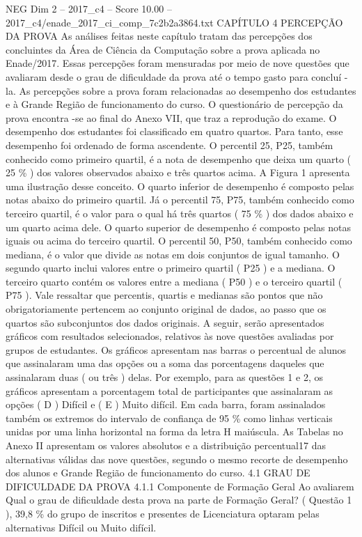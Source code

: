 \begin{textsample}{NEG Dim 2 – 2017\_c4 – Score 10.00 – 2017\_c4/enade\_2017\_ci\_comp\_7c2b2a3864.txt}  \label{ex:f2_neg_343}
CAPÍTULO 4 PERCEPÇÃO DA PROVA As análises feitas neste capítulo tratam das percepções dos concluintes da Área de Ciência da Computação sobre a prova aplicada no Enade/2017.
Essas percepções foram mensuradas por meio de nove questões que avaliaram desde o grau de dificuldade da prova até o tempo gasto para concluí -la.
As percepções sobre a prova foram relacionadas ao desempenho dos estudantes e à Grande Região de funcionamento do curso.
O questionário de percepção da prova encontra -se ao final do Anexo VII, que traz a reprodução do exame.
O desempenho dos estudantes foi classificado em quatro quartos.
Para tanto, esse desempenho foi ordenado de forma ascendente.
O percentil 25, P25, também conhecido como primeiro quartil, é a nota de desempenho que deixa um quarto ( 25 \% ) dos valores observados abaixo e três quartos acima.
A Figura 1 apresenta uma ilustração desse conceito.
O quarto inferior de desempenho é composto pelas notas abaixo do primeiro quartil.
Já o percentil 75, P75, também conhecido como terceiro quartil, é o valor para o qual há três quartos ( 75 \% ) dos dados abaixo e um quarto acima dele.
O quarto superior de desempenho é composto pelas notas iguais ou acima do terceiro quartil.
O percentil 50, P50, também conhecido como mediana, é o valor que divide as notas em dois conjuntos de igual tamanho.
O segundo quarto inclui valores entre o primeiro quartil ( P25 ) e a mediana.
O terceiro quarto contém os valores entre a mediana ( P50 ) e o terceiro quartil ( P75 ).
Vale ressaltar que percentis, quartis e medianas são pontos que não obrigatoriamente pertencem ao conjunto original de dados, ao passo que os quartos são subconjuntos dos dados originais.
A seguir, serão apresentados gráficos com resultados selecionados, relativos às nove questões avaliadas por grupos de estudantes.
Os gráficos apresentam nas barras o percentual de alunos que assinalaram uma das opções ou a soma das porcentagens daqueles que assinalaram duas ( ou três ) delas.
Por exemplo, para as questões 1 e 2, os gráficos apresentam a porcentagem total de participantes que assinalaram as opções ( D ) Difícil e ( E ) Muito difícil.
Em cada barra, foram assinalados também os extremos do intervalo de confiança de 95 \% como linhas verticais unidas por uma linha horizontal na forma da letra H maiúscula.
As Tabelas no Anexo II apresentam os valores absolutos e a distribuição percentual17 das alternativas válidas das nove questões, segundo o mesmo recorte de desempenho dos alunos e Grande Região de funcionamento do curso. 4.1 GRAU DE DIFICULDADE DA PROVA 4.1.1 Componente de Formação Geral Ao avaliarem Qual o grau de dificuldade desta prova na parte de Formação Geral? ( Questão 1 ), 39,8 \% do grupo de inscritos e presentes de Licenciatura optaram pelas alternativas Difícil ou Muito difícil.

\end{textsample}
